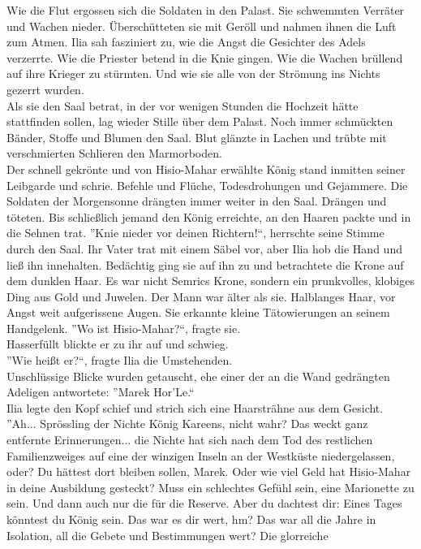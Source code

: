 Wie die Flut ergossen sich die Soldaten in den Palast. Sie schwemmten Verräter und Wachen nieder. 
Überschütteten sie mit Geröll und nahmen ihnen die Luft zum Atmen. Ilia sah fasziniert zu, wie die 
Angst die Gesichter des Adels verzerrte. Wie die Priester betend in die Knie gingen. Wie die Wachen 
brüllend auf ihre Krieger zu stürmten. Und wie sie alle von der Strömung ins Nichts gezerrt 
wurden.\\
Als sie den Saal betrat, in der vor wenigen Stunden die Hochzeit hätte stattfinden sollen, lag wieder 
Stille über dem Palast. Noch immer schmückten Bänder, Stoffe und Blumen den Saal. Blut glänzte in 
Lachen und trübte mit verschmierten Schlieren den Marmorboden.\\
Der schnell gekrönte und von Hisio-Mahar erwählte König stand inmitten seiner Leibgarde und 
schrie. Befehle und Flüche, Todesdrohungen und Gejammere. Die Soldaten der Morgensonne drängten 
immer weiter in den Saal. Drängen und töteten. Bis schließlich jemand den König erreichte, an 
den Haaren packte und in die Sehnen trat. ''Knie nieder vor deinen Richtern!``, herrschte seine 
Stimme durch den Saal. Ihr Vater trat mit einem Säbel vor, aber Ilia hob die Hand und ließ ihn 
innehalten. Bedächtig ging sie auf ihn zu und betrachtete die Krone auf dem dunklen Haar. Es war 
nicht Semrics Krone, sondern ein prunkvolles, klobiges Ding aus Gold und Juwelen. Der Mann 
war älter als sie. Halblanges Haar, vor Angst weit aufgerissene Augen. Sie erkannte kleine 
Tätowierungen an seinem Handgelenk. ''Wo ist Hisio-Mahar?``, fragte sie.\\
Hasserfüllt blickte er zu ihr auf und schwieg.\\
''Wie heißt er?``, fragte Ilia die Umstehenden.\\
Unschlüssige Blicke wurden getauscht, ehe einer der an die Wand gedrängten Adeligen antwortete: 
''Marek Hor'Le.``\\
Ilia legte den Kopf schief und strich sich eine Haarsträhne aus dem Gesicht. ''Ah... Sprössling der 
Nichte König Kareens, nicht wahr? Das weckt ganz entfernte Erinnerungen... die Nichte hat sich nach 
dem Tod des restlichen Familienzweiges auf eine der winzigen Inseln an der Westküste 
niedergelassen, oder? Du hättest dort bleiben sollen, Marek. Oder wie viel Geld hat Hisio-Mahar in 
deine Ausbildung gesteckt? Muss ein schlechtes Gefühl sein, eine Marionette zu sein. Und dann auch 
nur die für die Reserve. Aber du dachtest dir: Eines Tages könntest du König sein. Das war es dir 
wert, hm? Das war all die Jahre in Isolation, all die Gebete und Bestimmungen wert? Die glorreiche 
